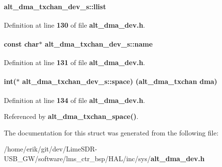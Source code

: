 \paragraph[{llist}]{ alt\+\_\+dma\+\_\+txchan\+\_\+dev\+\_\+s\+::llist}\label{structalt__dma__txchan__dev__s_aa280c23ab0637635bf62228731b4cfb7}


Definition at line {\bf 130} of file {\bf alt\+\_\+dma\+\_\+dev.\+h}.

\paragraph[{name}]{\setlength{\rightskip}{0pt plus 5cm}const char$\ast$ alt\+\_\+dma\+\_\+txchan\+\_\+dev\+\_\+s\+::name}\label{structalt__dma__txchan__dev__s_a27455331d8b92426358ad55d4583ea46}


Definition at line {\bf 131} of file {\bf alt\+\_\+dma\+\_\+dev.\+h}.

\paragraph[{space}]{\setlength{\rightskip}{0pt plus 5cm}int($\ast$ alt\+\_\+dma\+\_\+txchan\+\_\+dev\+\_\+s\+::space) ({\bf alt\+\_\+dma\+\_\+txchan} dma)}\label{structalt__dma__txchan__dev__s_a59191998d64e43f154abb2fe9b6a97c3}


Definition at line {\bf 134} of file {\bf alt\+\_\+dma\+\_\+dev.\+h}.



Referenced by {\bf alt\+\_\+dma\+\_\+txchan\+\_\+space()}.



The documentation for this struct was generated from the following file\+:\begin{DoxyCompactItemize}
\item 
/home/erik/git/dev/\+Lime\+S\+D\+R-\/\+U\+S\+B\+\_\+\+G\+W/software/lms\+\_\+ctr\+\_\+bsp/\+H\+A\+L/inc/sys/{\bf alt\+\_\+dma\+\_\+dev.\+h}\end{DoxyCompactItemize}
